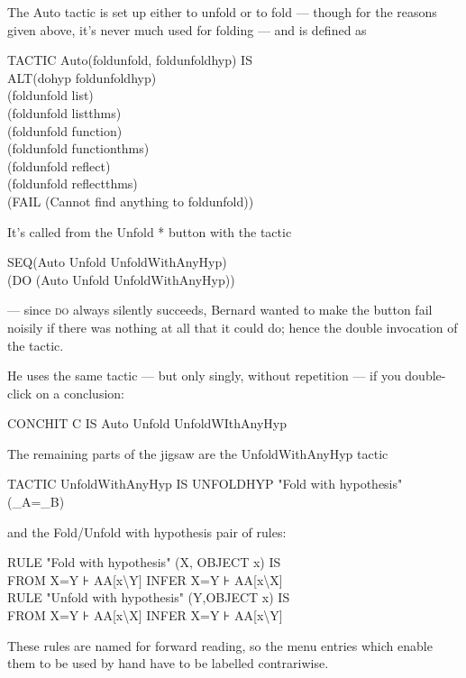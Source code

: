 The Auto tactic is set up either to unfold or to fold --- though for the reasons given above, it's never much used for folding --- and is defined as
\begin{japeish}
TACTIC Auto(foldunfold, foldunfoldhyp) IS \\
ALT\tab (dohyp foldunfoldhyp)\\
\tab (foldunfold list) \\
\tab (foldunfold listthms) \\
\tab (foldunfold function) \\
\tab (foldunfold functionthms) \\
\tab (foldunfold reflect) \\
\tab (foldunfold reflectthms)\\
\tab (FAIL (Cannot find anything to foldunfold))
\end{japeish}
It's called from the Unfold * button with the tactic
\begin{japeish}
SEQ\tab (Auto Unfold UnfoldWithAnyHyp) \\
\tab (DO (Auto Unfold UnfoldWithAnyHyp))
\end{japeish}
--- since \textsc{do} always silently succeeds, Bernard wanted to make the button fail noisily if there was nothing at all that it could do; hence the double invocation of the tactic.

He uses the same tactic --- but only singly, without repetition --- if you double-click on a conclusion:
\begin{japeish}
CONCHIT C IS Auto Unfold UnfoldWIthAnyHyp
\end{japeish}

The remaining parts of the jigsaw are the UnfoldWithAnyHyp tactic
\begin{japeish}
TACTIC UnfoldWithAnyHyp IS UNFOLDHYP "Fold with hypothesis" (\_A=\_B)
\end{japeish}
and the Fold/Unfold with hypothesis pair of rules:
\begin{japeish}
RULE "Fold with hypothesis" (X, OBJECT x) IS \\
\tab\tab FROM X=Y ⊦ AA[x{\textbackslash}Y] INFER X=Y ⊦ AA[x{\textbackslash}X]\\
RULE "Unfold with hypothesis" (Y,OBJECT x) IS \\
\tab\tab FROM X=Y ⊦ AA[x{\textbackslash}X] INFER X=Y ⊦ AA[x{\textbackslash}Y]
\end{japeish}
These rules are named for forward reading, so the menu entries which enable them to be used by hand have to be labelled contrariwise.

